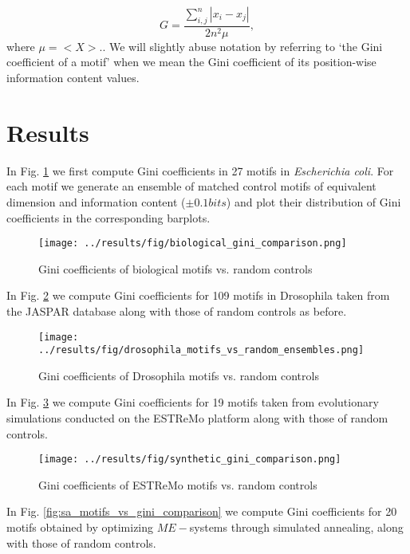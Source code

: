 \documentclass{article}
\begin{document}
\begin{equation}
  \label{eq:gini}
  G = \frac{\sum_{i,j}^n|x_i - x_j|}{2n^2\mu},
\end{equation}
where $\mu = <X>$.\cite{dixon87}.  We will slightly abuse notation by
referring to `the Gini coefficient of a motif' when we mean the Gini
coefficient of its position-wise information content values.

\section{Results}

In Fig. \ref{fig:ecoli_gini_comparison} we first compute Gini
coefficients in 27 motifs in \textit{Escherichia coli}.  For each
motif we generate an ensemble of matched control motifs of equivalent
dimension and information content ($\pm 0.1 bits$) and plot their
distribution of Gini coefficients in the corresponding barplots.

\begin{figure}[ht]
  \centering
  \texttt{[image: ../results/fig/biological\_gini\_comparison.png]}
  \caption{Gini coefficients of biological motifs vs. random controls}
  \label{fig:ecoli_gini_comparison}
\end{figure}

In Fig. \ref{fig:drosophila_gini_comparison} we compute Gini coefficients
for 109 motifs in Drosophila taken from the JASPAR
database\cite{jaspar} along with those of random controls as before.

\begin{figure}[ht]
  \centering
  \texttt{[image: ../results/fig/drosophila\_motifs\_vs\_random\_ensembles.png]}
  \caption{Gini coefficients of Drosophila motifs vs. random controls}
  \label{fig:drosophila_gini_comparison}
\end{figure}

In Fig. \ref{fig:estremo_gini_comparison} we compute Gini coefficients for
19 motifs taken from evolutionary simulations conducted on the ESTReMo
platform along with those of random controls.

\begin{figure}[ht]
  \centering
  \texttt{[image: ../results/fig/synthetic\_gini\_comparison.png]}
  \caption{Gini coefficients of ESTReMo motifs vs. random controls}
  \label{fig:estremo_gini_comparison}
\end{figure}

In Fig. \ref{fig:sa_motifs_vs_gini_comparison} we compute Gini
coefficients for 20 motifs obtained by optimizing $ME-$systems through
simulated annealing, along with those of random controls.
\end{document}
